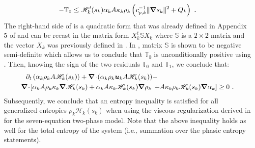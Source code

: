 \begin{appendices}
%
\begin{equation}\label{eq:new_quad_form}
- \mathbb{T}_0 \leq \mathscr{H}_k'(s_k) \alpha_k A \kappa_k \rho_k \left( c_{p,k}^{-1} \|\boldsymbol\nabla s_k\|^2 +  Q_k\right) \ .
\end{equation}
%
The right-hand side of  is a quadratic form that was already defined in Appendix 5 of \cite{jlg_VR_SIAM_2004} and can be recast in the matrix form $X^t_k \mathbb{S} X_k$ where $\mathbb{S}$ is a $2 \times 2$ matrix and the vector $X_k$ was previously defined in . In \cite{jlg_VR_SIAM_2004}, matrix $\mathbb{S}$ is shown to be negative semi-definite which allows us to conclude that $\mathbb{T}_0$ is unconditionally positive using . Then, knowing the sign of the two residuals $\mathbb{T}_0$ and $\mathbb{T}_1$, we conclude that:
%
\begin{align}\label{eq:ent-res-7-eqn-diss-terms-app4}
\partial_t \left( \alpha_k \rho_k A \mathscr{H}_k(s_k)\right) + \boldsymbol\nabla\! \cdot \! \left( \alpha_k \rho_k \boldsymbol u_k A \mathscr{H}_k(s_k) \right)  &- \nonumber\\
\boldsymbol\nabla\! \cdot \! \left[ \alpha_k A \rho_k \kappa_k \boldsymbol\nabla \mathscr{H}_k (s_k) + \alpha_k A \kappa_k \mathscr{H}_k (s_k) \boldsymbol\nabla \rho_k  \right. & \left. + A \kappa_k \rho_k \mathscr{H}_k (s_k) \boldsymbol\nabla \alpha_k\right] \geq 0 \ .\nonumber 
\end{align}
%
Subsequently, we conclude that an entropy inequality is satisfied for all generalized entropies $\rho_k \mathscr{H}_k (s_k)$ when using the viscous regularization derived in  for the seven-equation two-phase model. Note that the above inequality holds as well for the total entropy of the system (i.e., summation over the phasic entropy statements).
%

\end{appendices}





